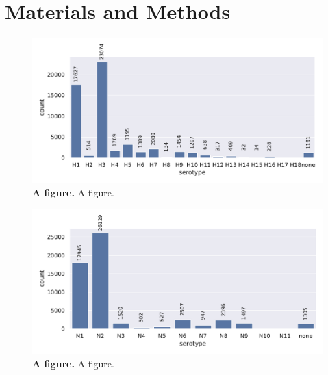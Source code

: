 \chapter{Materials and Methods} \label{chap:2}

\begin{figure}[!hbt]
    \caption[A figure]{\textbf{A figure.} A figure.}
    \label{fig:2.0.1}
    \includegraphics[width=\dimexpr\textwidth-2\fboxsep-2\fboxrule,fbox]{PCA/Data_Overview_Segment_4_H.pdf}
\end{figure}

\begin{figure}[!hbt]
    \caption[A figure]{\textbf{A figure.} A figure.}
    \label{fig:2.0.2}
    \includegraphics[width=\dimexpr\textwidth-2\fboxsep-2\fboxrule,fbox]{PCA/Data_Overview_Segment_6_N.pdf}
\end{figure}











